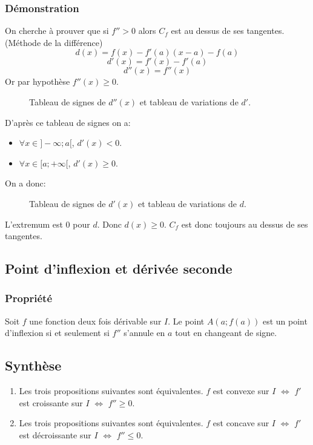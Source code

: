 \documentclass[9pt,twoside]{article}
\begin{document}
\subsubsection*{Démonstration}
On cherche à prouver que si $f''>0$ alors $C_f$ est au dessus de ses tangentes. 
\\(Méthode de la différence)
$$d(x) = f(x) - f'(a)(x-a)-f(a)$$
$$d'(x) = f'(x) - f'(a)$$
$$d''(x) = f''(x)$$
Or par hypothèse $f''(x)\geq 0$.
\begin{figure}[H]
	\centering
	\caption{Tableau de signes de $d''(x)$ et tableau de variations de $d'$.}
\end{figure}
D'après ce tableau de signes on a:
\begin{itemize}[label=\textbullet]
	\item $\forall x \in ]-\infty;a[$, $d'(x)<0$.
	\item $\forall x \in [a;+\infty[$, $d'(x)\geq 0$.
\end{itemize}
On a donc:
\begin{figure}[H]
	\centering
	\caption{Tableau de signes de $d'(x)$ et tableau de variations de $d$.}
\end{figure}
L'extremum est 0 pour $d$. Donc $d(x)\geq 0$.
$C_f$ est donc toujours au dessus de ses tangentes.
\subsection{Point d'inflexion et dérivée seconde}
\subsubsection*{Propriété}
Soit $f$ une fonction deux fois dérivable sur $I$. Le point $A(a;f(a))$ est un point d'inflexion si et seulement si $f''$ s'annule en $a$ tout en changeant de signe.
\subsection{Synthèse}
\begin{enumerate}
	\item Les trois propositions suivantes sont équivalentes. $f$ est convexe sur $I$ $\iff$ $f'$ est croissante sur $I$ $\iff$ $f''\geq 0$.
	\item Les trois propositions suivantes sont équivalentes. $f$ est concave sur $I$ $\iff$ $f'$ est décroissante sur $I$ $\iff$ $f''\leq 0$.
\end{enumerate}
\end{document}

